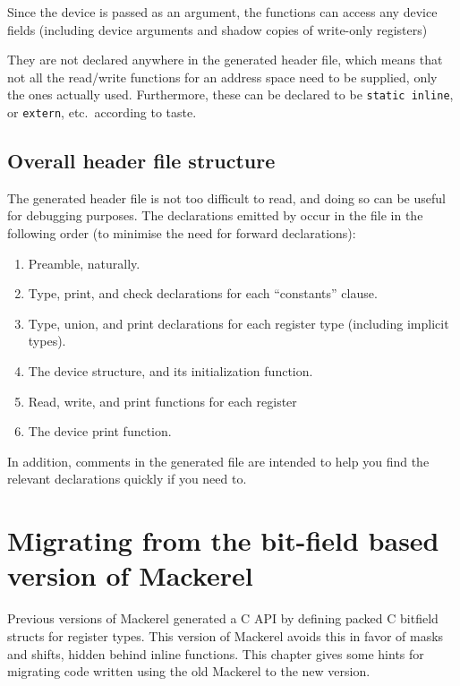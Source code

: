 \documentclass[a4paper,11pt,twoside]{report}
\begin{document}
Since the device is passed as an argument, the functions can access
any device fields (including device arguments and shadow copies of
write-only registers) 

They are not
declared anywhere in the generated header file, which means that not
all the read/write functions for an 
address space need to be supplied, only the ones actually used.
Furthermore, these can be declared to be \texttt{static inline}, or
\texttt{extern}, etc.\ according to taste.

\section{Overall header file structure}

The generated header file is not too difficult to read, and doing so
can be useful for debugging purposes.  The declarations emitted by
\Mac occur in the file in the following order (to minimise the need
for forward declarations):

\begin{enumerate}
\item Preamble, naturally.
\item Type, print, and check declarations for each ``constants''
  clause.
\item Type, union, and print declarations for each register type
  (including implicit types). 
\item The device structure, and its initialization function.
\item Read, write, and print functions for each register
\item The device print function. 
\end{enumerate}

In addition, comments in the generated file are intended to help you
find the relevant declarations quickly if you need to. 

\chapter{Migrating from the bit-field based version of Mackerel}
\label{chap:migrating}

Previous versions of Mackerel generated a C API by defining packed C
bitfield structs for register types.  This version of Mackerel avoids
this in favor of masks and shifts, hidden behind inline functions.
This chapter gives some hints for migrating code written using the old
Mackerel to the new version. 
\end{document}
